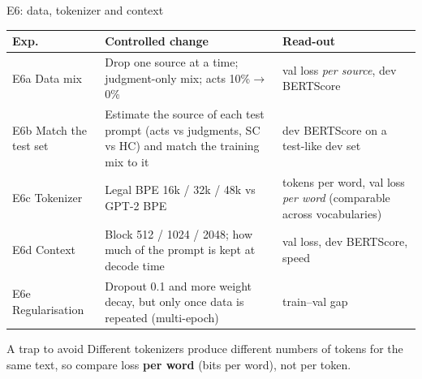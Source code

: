 \documentclass[aspectratio=169,11pt]{beamer}
\begin{document}
\begin{frame}{E6: data, tokenizer and context}
  \footnotesize
  \begin{tabularx}{\textwidth}{@{}lXX@{}}
    \toprule
    Exp. & Controlled change & Read-out\\
    \midrule
    E6a Data mix & Drop one source at a time; judgment-only mix; acts 10\%$\to$0\% & val loss \emph{per source}, dev BERTScore\\
    E6b Match the test set & Estimate the source of each test prompt (acts vs judgments, SC vs HC) and match the training mix to it & dev BERTScore on a test-like dev set\\
    E6c Tokenizer & Legal BPE 16k / 32k / 48k vs GPT-2 BPE & tokens per word, val loss \emph{per word} (comparable across vocabularies)\\
    E6d Context & Block 512 / 1024 / 2048; how much of the prompt is kept at decode time & val loss, dev BERTScore, speed\\
    E6e Regularisation & Dropout 0.1 and more weight decay, but only once data is repeated (multi-epoch) & train--val gap\\
    \bottomrule
  \end{tabularx}

  \vspace{1mm}
  \begin{alertblock}{A trap to avoid}
    \small Different tokenizers produce different numbers of tokens for the same text, so compare loss \textbf{per word} (bits per word), not per token.
  \end{alertblock}
\end{frame}
\end{document}
